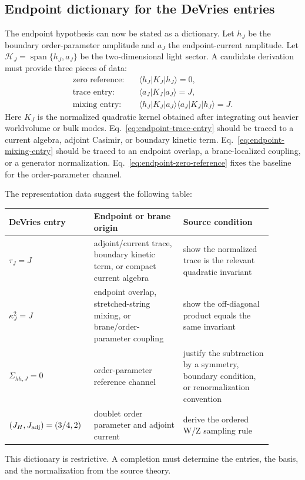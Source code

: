 \subsection{Endpoint dictionary for the DeVries entries}
\label{sec:endpoint-dictionary}

The endpoint hypothesis can now be stated as a dictionary.  Let \(h_J\) be the boundary order-parameter amplitude and \(a_J\) the endpoint-current amplitude.  Let \(\mathcal H_J=\operatorname{span}\{h_J,a_J\}\) be the two-dimensional light sector.  A candidate derivation must provide three pieces of data:
\begin{align}
  \text{zero reference:}\quad & \langle h_J|K_J|h_J\rangle=0,
  \label{eq:endpoint-zero-reference}\\
  \text{trace entry:}\quad & \langle a_J|K_J|a_J\rangle=J,
  \label{eq:endpoint-trace-entry}\\
  \text{mixing entry:}\quad & \langle h_J|K_J|a_J\rangle
  \langle a_J|K_J|h_J\rangle=J .
  \label{eq:endpoint-mixing-entry}
\end{align}
Here \(K_J\) is the normalized quadratic kernel obtained after integrating out heavier worldvolume or bulk modes.  Eq.~\eqref{eq:endpoint-trace-entry} should be traced to a current algebra, adjoint Casimir, or boundary kinetic term.  Eq.~\eqref{eq:endpoint-mixing-entry} should be traced to an endpoint overlap, a brane-localized coupling, or a generator normalization.  Eq.~\eqref{eq:endpoint-zero-reference} fixes the baseline for the order-parameter channel.

The representation data suggest the following table:
\begin{center}
\begin{tabular}{p{0.25\linewidth}p{0.32\linewidth}p{0.32\linewidth}}
\toprule
DeVries entry & Endpoint or brane origin & Source condition \\
\midrule
\(\tau_J=J\) & adjoint/current trace, boundary kinetic term, or compact current algebra & show the normalized trace is the relevant quadratic invariant \\
\(\kappa_J^2=J\) & endpoint overlap, stretched-string mixing, or brane/order-parameter coupling & show the off-diagonal product equals the same invariant \\
\(\Sigma_{hh,J}=0\) & order-parameter reference channel & justify the subtraction by a symmetry, boundary condition, or renormalization convention \\
\((J_H,J_{\rm adj})=(3/4,2)\) & doublet order parameter and adjoint current & derive the ordered W/Z sampling rule \\
\bottomrule
\end{tabular}
\end{center}
This dictionary is restrictive.  A completion must determine the entries, the basis, and the normalization from the source theory.

